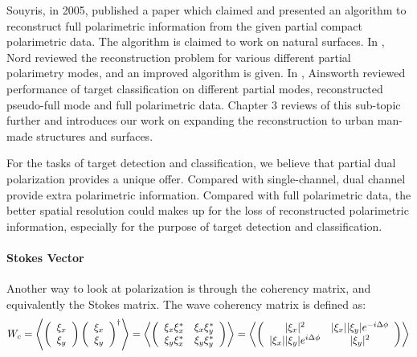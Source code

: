 Souyris, in 2005, published a paper \cite{Souyris_2005_TGRS} which claimed and presented an algorithm to reconstruct full polarimetric information from the given partial compact polarimetric data.
The algorithm is claimed to work on natural surfaces.
In \cite{Nord_2009}, Nord reviewed the reconstruction problem for various different partial polarimetry modes, and an improved algorithm is given.
In \cite{Ainsworth_2009_ISPRS}, Ainsworth reviewed performance of target classification on different partial modes, reconstructed pseudo-full mode and full polarimetric data.
Chapter 3 reviews of this sub-topic further and introduces our work on expanding the reconstruction to urban man-made structures and surfaces.

For the tasks of target detection and classification, we believe that partial dual polarization provides a unique offer.
Compared with single-channel, dual channel provide extra polarimetric information. 
Compared with full polarimetric data, the better spatial resolution could makes up for the loss of reconstructed polarimetric information, especially for the purpose of target detection and classification.
\paragraph{ Stokes Vector }

Another way to look at polarization is through the coherency matrix, and equivalently the Stokes matrix.
The wave coherency matrix is defined as:
\begin{equation}
W_c = \left<
\left(
\begin{array}{c}
 \xi_x \\
 \xi_y
\end{array}
\right)
\left(
\begin{array}{c}
 \xi_x \\
 \xi_y
\end{array}
\right)^{\dagger}
\right>
= \left<
\left(
\begin{array}{c c}
 \xi_x \xi_x^* 	& \xi_x \xi_y^* \\
 \xi_y \xi_x^* 	& \xi_y \xi_y^* 
\end{array}
\right)
\right>
= \left<
\left(
\begin{array}{c c}
 |\xi_x|^2 	& |\xi_x| |\xi_y| e^{-i \Delta \phi} \\
 |\xi_x| |\xi_y| e^{i \Delta \phi} 	& |\xi_y|^2
\end{array}
\right)
\right>
\end{equation}

